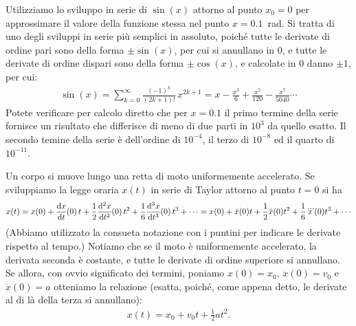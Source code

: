 \begin{examplebox}
  \begin{example}\label{exp:sviluppo_taylor_seno}
    Utilizziamo lo sviluppo in serie di $\sin(x)$ attorno al punto $x_0 = 0$
    per approssimare il valore della funzione stessa nel punto $x = 0.1$~rad.
    Si tratta di uno degli sviluppi in serie più semplici in assoluto,
    poiché tutte le derivate di ordine pari sono della forma $\pm \sin(x)$,
    per cui si annullano in $0$, e tutte le derivate di ordine dispari sono
    della forma $\pm \cos(x)$, e calcolate in $0$ danno $\pm 1$, per cui:
    \begin{align*}
      \sin(x) = \sum_{k=0}^\infty  \frac{(-1)^k}{(2k + 1)!} \, x^{2k + 1} =
      x - \frac{x^3}{6} + \frac{x^5}{120} -
      \frac{x^7}{5040} \cdots
    \end{align*}
    Potete verificare per calcolo diretto che per $x = 0.1$ il primo termine
    della serie fornisce un risultato che differisce di meno di due parti in
    $10^3$ da quello esatto. Il secondo temine della serie è dell'ordine di
    $10^{-4}$, il terzo di $10^{-8}$ ed il quarto di $10^{-11}$.
  \end{example}

  \begin{example}
    Un corpo si muove lungo una retta di moto uniformemente accelerato.
    Se sviluppiamo la legge oraria $x(t)$ in serie di Taylor attorno al
    punto $t = 0$ si ha
    \begin{align*}
      x(t) = x(0) + \td{x}{t}{0} t + \frac{1}{2}\td[2]{x}{t}{0} t^2 +
      \frac{1}{6}\td[3]{x}{t}{0} t^3 + \cdots =
      x(0) + \dot{x}(0) t + \frac{1}{2}\ddot{x}(0) t^2
      + \frac{1}{6}\dddot{x}(0)t^3 + \cdots
    \end{align*}
    (Abbiamo utilizzato la consueta notazione con i puntini per indicare le
    derivate rispetto al tempo.) Notiamo che se il moto è uniformemente
    accelerato, la derivata seconda è costante, e tutte le derivate di
    ordine superiore si annullano. Se allora, con ovvio significato dei
    termini, poniamo $x(0) = x_0$, $\dot{x}(0) = v_0$ e $\ddot{x}(0) = a$
    otteniamo la relazione (esatta, poiché, come appena detto, le derivate
    al di là della terza si annullano):
    \begin{align*}
      x(t) = x_0 + v_0t + \frac{1}{2}at^2.
    \end{align*}
  \end{example}
\end{examplebox}

